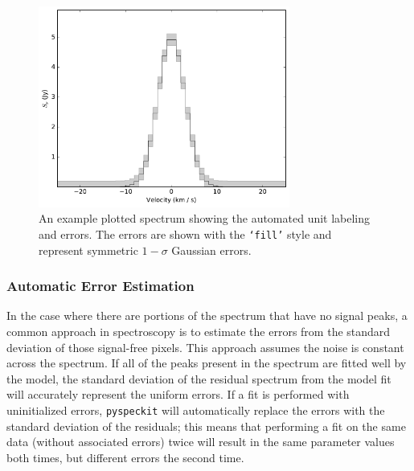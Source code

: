 \documentclass[twocolumn]{aastex62}
\newcommand{\pyspeckit}{\texttt{pyspeckit}\xspace}
\begin{document}
\begin{figure}[!htp]
\includegraphics[scale=1,width=3.25in]{example_fig_1.pdf}
\caption{An example plotted spectrum showing the automated unit labeling
and errors.  The errors are shown with the \texttt{`fill'} style
and represent symmetric $1-\sigma$ Gaussian errors.  }
\label{fig:example1}
\end{figure}




\subsubsection{Automatic Error Estimation}
In the case where there are portions of the spectrum that have no
signal peaks, a common approach in spectroscopy is to estimate the
errors from the standard deviation of those signal-free pixels.  This approach
assumes the noise is constant across the spectrum.  If all of the peaks present
in the spectrum are fitted well by the model,
the standard deviation of the residual spectrum from the model fit will
accurately represent the uniform errors.     If a fit is performed with
uninitialized errors, \pyspeckit will automatically replace the errors with the
standard deviation of the residuals; this means that performing a fit on the
same data (without associated errors) twice will result in the same parameter
values both times, but different errors the second time.
\end{document}
